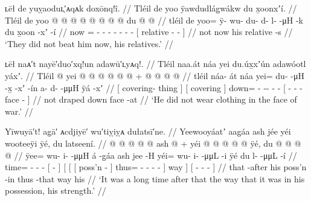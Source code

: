 \ex\label{ex:93-67-dont-beat-him-now}%
%
\begingl
	\glpreamble	ʟēł de yuỵaoduʟ̣′ᴀqᴀk doxōnq!î. //
	\glpreamble	Tléil de yoo ÿawdudlág̱wákw du x̱oonxʼí. //
	\gla	Tléil de 
		yoo @  @ {} @ {} @ {} @ {} @ {} @ {} @ {}
		{} du  @ {} @ {} {} //
	\glb	tléil de
		yoo= ÿ- wu- du- d- l-  -μH -k
		{} du x̱oon -xʼ -í {} //
	\glc	{} now
		= - - - - -  - -
		{}[  relative - - {}] //
	\gld	not now
		  {} {} {} {} {} {} {}
		{} his relative -s {} {} //
	\glft	‘They did not beat him now, his relatives.’
		//
\endgl
\xe

\ex\label{ex:93-68-not-clothed-in-war}%
%
\begingl
	\glpreamble	ʟēł naᴀ′t nayē′duo′xq!un adawū′ʟyᴀq!. //
	\glpreamble	Tléil naa.át náa yei du.úx̱xʼún adawóotl yáxʼ. //
	\gla	Tléil {}  @ {} {}
		{}  {}
		yei @  @ {} @ {} @ {} @ {} @ {} +
		{}  @ {} @ {} @ {}  @ {} {} //
	\glb	tléil {} náa- át {}
		{} náa {}
		yei= du-  -μH -x̱ -xʼ -ín
		{} a- d-  -μμH ÿá -xʼ {} //
	\glc	{} {}[ covering- thing {}]
		{}[ covering {}]
		down= -  --  - -
		{}[ - -  - face - {}] //
	\gld	not {}  {} {}
		{} draped {}
		down  {} {} {} {} {}
		{}  {} {} {} face -at {} //
	\glft	‘He did not wear clothing in the face of war.’
		//
\endgl
\xe

\ex\label{ex:93-69-strength-in-his-possession}%
%
\begingl
	\glpreamble	Yīwuyā′t! ag̣ā′ ᴀcdjiyē′ wu′tiỵiỵᴀ dułatsī′ne. //
	\glpreamble	Yeewooyáatʼ aag̱áa ash jée yéi wooteeÿi ÿé, du latseení. //
	\gla	{} @ {} @ {} @ {} @ {}
		{}  @ {} {}
		{} {} {} ash  @ {} {} +
			yéi @  @ {} @ {} @ {} @ {} {} ÿé, {}
		{} du  @ {} @ {} @ {} @ {} {} //
	\glb	ÿee= wu- i-  -μμH
		{} á -g̱áa {}
		{} {} {} ash jee -H {}
			yéi= wu- i-  -μμL -i {} ÿé {}
		{} du l-  -μμL {} -í {} //
	\glc	time= - -  -
		{}[  - {}]
		{}[ {}[ {}[  poss’n - {}]
			thus= - -  - - {}] way {}]
		{}[  -  - \· - {}] //
	\gld	{} {} {} {} {}
		{} that -after {}
		{} {} {} his poss’n -in {}
			thus  {} {} {} -that {} way {}
		{} his  {} {} {} {} {} //
	\glft	‘It was a long time after that the way that it was in his possession, his strength.’
		//
\endgl
\xe

